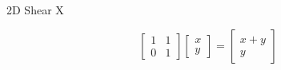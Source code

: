 \documentclass{beamer}
\begin{document}
\begin{frame}{2D Shear X}

\[ \left[ \begin{array}{cc} 1 & 1 \\ 0 & 1 \end{array} \right] \left[ \begin{array}{c} x \\ y \end{array} \right] =  \left[ \begin{array}{c} x + y \\ y  \end{array} \right] \]

\begin{figure}[t]
    \captionsetup[subfloat]{labelformat=empty}
	\centering
\end{figure}

\end{frame}
\end{document}
